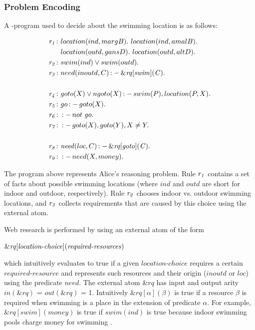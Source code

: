 \documentclass[a4paper, titlepage]{article}
\newcommand{\ext}[3]{\ensuremath{\&{#1}[#2](#3)}}
\DeclareMathOperator{\leftimpl}{:-}
\newcommand{\row}[1]{%
  \ensuremath{\it \color{black} #1 \color{black}}%
}
\begin{document}
\subsubsection{Problem Encoding}
A \hex-program used to decide about the swimming location is as 
follows:
\begin{exmp}
\label{swimExample}
\begin{align*}
\row{r_1}\colon& location(ind, margB). \ location(ind, amalB). \ \\& 
location(outd, gansD). \ location(outd, altD). \\  
\row{r_2}\colon& swim(ind) \vee swim(outd).\\ 
\row{r_3}\colon& need(inoutd, C) \leftimpl \ext{\mathit{rq}}
{\mathit{swim}}{\mathit{C}}. \\
\\
\row{r_4}\colon& goto(X) \vee ngoto(X) \leftimpl swim(P), 
location(P, X).\\
\row{r_5}\colon& go \leftimpl goto(X).\\
\row{r_6}\colon& \leftimpl not \ go. \\
\row{r_7}\colon& \leftimpl goto(X), goto(Y), X \neq Y. \\
\\
\row{r_8}\colon& \mathit{need}(loc, C) \leftimpl 
\ext{\mathit{rq}}{\mathit{goto}}{\mathit{C}}. \\ 
\row{r_9}\colon& \leftimpl need(X, money).
\end{align*}
\end{exmp}
The \hex{} program above represents Alice's reasoning 
problem. Rule $\row{r_1}$ contains a set of facts about possible 
swimming locations (where $\mathit{ind}$ and 
$\mathit{outd}$ are short for indoor and outdoor, 
respectively). Rule $\row{r_2}$ chooses indoor vs. outdoor 
swimming locations, and $\row{r_3}$ collects requirements that 
are caused by this choice using the external atom. 

Web research is performed by using an external atom of the 
form 
\\ \centerline{$\ext{\mathit{rq}}{\mathit{location}$-$
\mathit{choice}}{\mathit{required}$-$\mathit{resources}}$}
which intuitively 
evaluates to true if a given $\mathit{location}$-$\mathit{choice}$ 
requires a certain $\mathit{required}$-$\mathit{resource}$ and 
represents such resources  and their origin 
($\mathit{inoutd}$ or $\mathit{loc}$) using the predicate 
$\mathit{need}$. The external atom $\mathit{\&rq}$ has 
input and output arity $\mathit{in(\&rq)}$ = 
$\mathit{out(\&rq)}$ = 1. Intuitively  $\ext{\mathit{rq}}
{\mathit{\alpha}}{\mathit{\beta}}$ is true if a resource 
$\beta$ is required when swimming is a place in the 
extension of predicate $\alpha$. For example, 
$\ext{\mathit{rq}}{\mathit{swim}}{\mathit{money}}$ is true 
if $\mathit{swim(ind)}$ is true because indoor swimming 
pools charge money for swimming \cite{efikrs2015}. 
\end{document}
